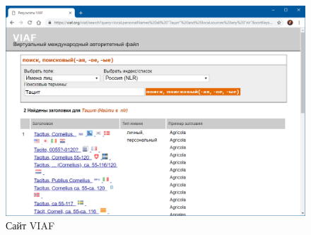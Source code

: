 \begin{figure}
    \centering
    \includegraphics[width=\linewidth]{img/viaf}
    \caption{Сайт VIAF}
    \label{fig:viaf}
\end{figure}

